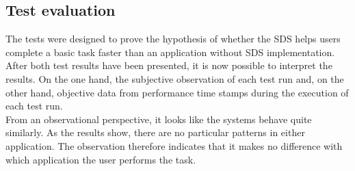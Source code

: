 \subsection{Test evaluation}
The tests were designed to prove the hypothesis of whether the SDS helps users complete a basic task faster than an application without SDS implementation. After both test results have been presented, it is now possible to interpret the results. On the one hand, the subjective observation of each test run and, on the other hand, objective data from performance time stamps during the execution of each test run. \\
From an observational perspective, it looks like the systems behave quite similarly. As the results show, there are no particular patterns in either application. The observation therefore indicates that it makes no difference with which application the user performs the task. \\

